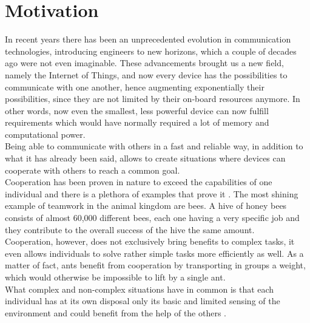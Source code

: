 \documentclass[conference]{IEEEtran}
\begin{document}
\section{Motivation}
In recent years there has been an unprecedented evolution in communication technologies, introducing engineers to new horizons, which a couple of decades ago were not even imaginable. These advancements brought us a new field, namely the Internet of Things, and now every device has the possibilities to communicate with one another, hence augmenting exponentially their possibilities, since they are not limited by their on-board resources anymore. In other words, now even the smallest, less powerful device can now fulfill requirements which would have normally required a lot of memory and computational power. \\
Being able to communicate with others in a fast and reliable way, in addition to what it has already been said, allows to create situations where devices can cooperate with others to reach a common goal.\\ Cooperation has been proven in nature to exceed the capabilities of one individual and there is a plethora of examples that prove it \cite{guided}. The most shining example of teamwork in the animal kingdom are bees. A hive of honey bees consists of almost 60,000 different bees, each one having a very specific job and they contribute to the overall success of the hive the same amount\cite{MAAREC}. \\
Cooperation, however, does not exclusively bring benefits to complex tasks, it even allows individuals to solve rather simple tasks more efficiently as well. As a matter of fact, ants benefit from cooperation by transporting in groups a weight, which would otherwise be impossible to lift by a single ant. \\
What complex and non-complex situations have in common is that each individual has at its own disposal only its basic and limited sensing of the environment and could benefit from the help of the others \cite{guided}. \\
\end{document}

